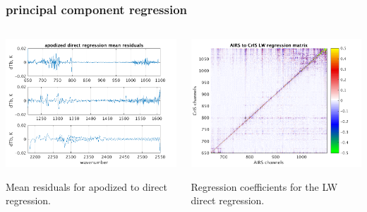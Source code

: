 \documentclass[10pt]{beamer}
\begin{document}
\begin{frame}
\begin{columns}[t]
\begin{column}{0.5\textwidth}
\end{column}
\end{columns}
\end{frame}
\begin{frame}
\frametitle{principal component regression}
\begin{columns}[t]
\begin{column}{0.5\textwidth}
  \begin{centering}
  \includegraphics[width=\textwidth]{slackfigs/ap_direct_regr.png}
  \end{centering}\vspace{3mm}
  Mean residuals for apodized {\airs} to {\cris} direct regression.

\end{column}
\begin{column}{0.5\textwidth}  
  \begin{centering}
  \includegraphics[width=\textwidth]{slackfigs/full_7377_LW_regr_mat.png}
  \end{centering}\vspace{3mm}
  Regression coefficients for the LW direct regression.

\end{column}
\end{columns}
\end{frame}
\end{document}

